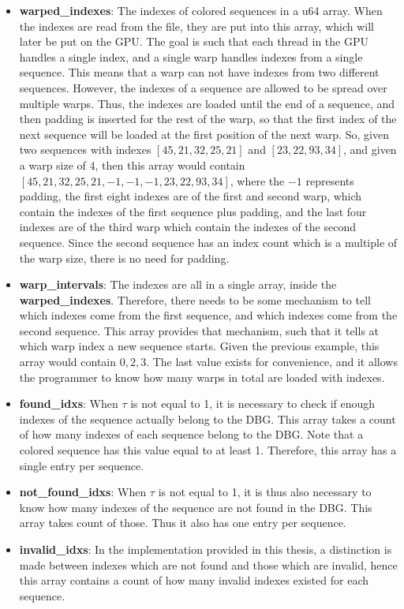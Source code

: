 \begin{itemize}
  \item \textbf{warped\_indexes}: The indexes of colored sequences in a u64 array. When the indexes are read from the file, they are put into this array, which will later be put on the GPU. The goal is such that each thread in the GPU handles a single index, and a single warp handles indexes from a single sequence. This means that a warp can not have indexes from two different sequences. However, the indexes of a sequence are allowed to be spread over multiple warps. Thus, the indexes are loaded until the end of a sequence, and then padding is inserted for the rest of the warp, so that the first index of the next sequence will be loaded at the first position of the next warp. So, given two sequences with indexes $[45, 21, 32, 25, 21]$ and $[23, 22, 93, 34]$, and given a warp size of 4, then this array would contain $[45, 21, 32, 25, 21, -1, -1, -1, 23, 22, 93, 34]$, where the $-1$ represents padding, the first eight indexes are of the first and second warp, which contain the indexes of the first sequence plus padding, and the last four indexes are of the third warp which contain the indexes of the second sequence. Since the second sequence has an index count which is a multiple of the warp size, there is no need for padding.
  \item \textbf{warp\_intervals}: The indexes are all in a single array, inside the \textbf{warped\_indexes}. Therefore, there needs to be some mechanism to tell which indexes come from the first sequence, and which indexes come from the second sequence. This array provides that mechanism, such that it tells at which warp index a new sequence starts. Given the previous example, this array would contain $0, 2, 3$. The last value exists for convenience, and it allows the programmer to know how many warps in total are loaded with indexes.
  \item \textbf{found\_idxs}: When $\tau$ is not equal to 1, it is necessary to check if enough indexes of the sequence actually belong to the DBG. This array takes a count of how many indexes of each sequence belong to the DBG. Note that a colored sequence has this value equal to at least 1. Therefore, this array has a single entry per sequence.
  \item \textbf{not\_found\_idxs}: When $\tau$ is not equal to 1, it is thus also necessary to know how many indexes of the sequence are not found in the DBG. This array takes count of those. Thus it also has one entry per sequence.
  \item \textbf{invalid\_idxs}: In the implementation provided in this thesis, a distinction is made between indexes which are not found and those which are invalid, hence this array contains a count of how many invalid indexes existed for each sequence.

\end{itemize}
